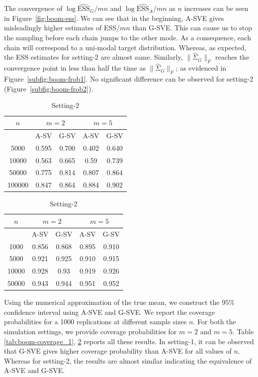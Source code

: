 \documentclass[11pt]{article}
\theoremstyle{remark}
\begin{document}
The convergence of $\log \widehat{\textrm{ESS}}_G/mn$ and $\log \widehat{\textrm{ESS}}_A/mn$ as $n$ increases can be seen in Figure~\ref{fig:boom-ess}. We can see that in the beginning, A-SVE gives misleadingly higher estimates of ESS$/mn$ than G-SVE. This can cause us to stop the sampling before each chain jumps to the other mode. As a consequence, each chain will correspond to a uni-modal target distribution. Whereas, as expected, the ESS estimates for setting-2 are almost same. Similarly, $\|\hat{\Sigma}_G\|_F$ reaches the convergence point in less than half the time as $\|\hat{\Sigma}_G\|_F$; as evidenced in Figure~\ref{subfig:boom-frob1}. No significant difference can be observed for setting-2 (Figure~\ref{subfig:boom-frob2}).

\begin{table}[h]
\parbox{.45\linewidth}{
\centering
\begin{tabular}{|c|c|c|c|c|}
\hline
 $n$ & \multicolumn{2}{|c|}{$m = 2$} & \multicolumn{2}{|c|}{$m=5$}\\
 \hline
 & A-SV & G-SV & A-SV & G-SV \\
 \hline
 5000 & 0.595 &  0.700 & 0.402 &  0.640\\
 10000 & 0.563 &  0.665 & 0.59 &  0.739\\
 50000 & 0.775 &  0.814 & 0.807 &  0.864\\
 100000 & 0.847 &  0.864 & 0.884 &  0.902\\
\hline
\end{tabular}
\caption{Setting-1}
\label{tab:boom-coverage_1}
}
\hfill
\parbox{.45\linewidth}{
\centering
\begin{tabular}{|c|c|c|c|c|}
 \hline
 $n$ & \multicolumn{2}{|c|}{$m = 2$} & \multicolumn{2}{|c|}{$m=5$}\\
 \hline
 & A-SV & G-SV & A-SV & G-SV \\
 \hline
 1000 &  0.856 &  0.868 & 0.895 &  0.910\\
 5000 & 0.921 &  0.925 & 0.910 &  0.915\\
 10000 & 0.928 &  0.93 & 0.919 &  0.926\\
 50000 & 0.943 &  0.944 & 0.951 &  0.952\\
\hline
\end{tabular}
\caption{Setting-2}
\label{tab:boom-coverage_2}
}
\end{table}

Using the numerical approximation of the true mean, we construct the $95\%$ confidence interval using A-SVE and G-SVE. We report the coverage probabilities for a 1000 replications at different sample sizes $n$. For both the simulation settings, we provide coverage probabilities for $m=2$ and $m=5$. Table \ref{tab:boom-coverage_1}, \ref{tab:boom-coverage_2} reports all these results. In setting-1, it can be observed that G-SVE gives higher coverage probability than A-SVE for all values of $n$. Whereas for setting-2, the results are almost similar indicating the equivalence of A-SVE and G-SVE.
\end{document}
